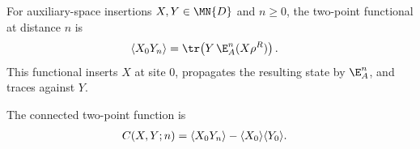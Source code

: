 \begin{definition}\label{def:two_point_expectation}
    \leanok
    For auxiliary-space insertions $X,Y\in\MN{D}$ and $n\ge0$, the two-point
    functional at distance $n$ is
    \begin{align}
        \langle X_0 Y_n \rangle
         & = \tr\!\left(Y\,\E_A^n(X\rho^R)\right). \notag
    \end{align}
    This functional inserts $X$ at site $0$, propagates the resulting state by
    $\E_A^n$, and traces against $Y$.
    \begin{center}
        \tenkzkernel
        \begin{tenkz}[rows={wire,wire}, cols=3,
                west={cup=$Y$}, east={cup=$X\rho^R$}]
        \end{tenkz}
    \end{center}
\end{definition}

\begin{definition}\label{def:connected_correlator}
    \leanok
    The connected two-point function is
    \begin{align}
        C(X,Y;n)
         & = \langle X_0Y_n\rangle
        - \langle X_0\rangle\langle Y_0\rangle. \notag
    \end{align}
\end{definition}

